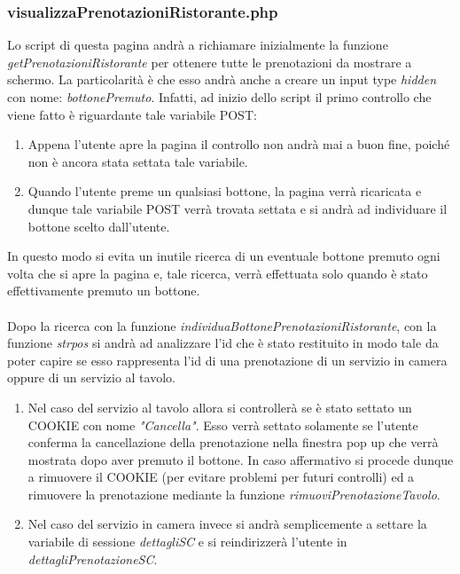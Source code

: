 \documentclass [a4paper, 12pt]{book}
\begin{document}
\subsubsection{visualizzaPrenotazioniRistorante.php}
Lo script di questa pagina andrà a richiamare inizialmente la funzione \textit{getPrenotazioniRistorante} per ottenere tutte le prenotazioni da mostrare a schermo. La particolarità è che esso andrà anche a creare un input type \textit{hidden} con nome: \textit{bottonePremuto}. Infatti, ad inizio dello script il primo controllo che viene fatto è riguardante tale variabile POST:
\begin{enumerate}
\item Appena l'utente apre la pagina il controllo non andrà mai a buon fine, poiché non è ancora stata settata tale variabile.
\item Quando l'utente preme un qualsiasi bottone, la pagina verrà ricaricata e dunque tale variabile POST verrà trovata settata e si andrà ad individuare il bottone scelto dall'utente.
\end{enumerate}
In questo modo si evita un inutile ricerca di un eventuale bottone premuto ogni volta che si apre la pagina e, tale ricerca, verrà effettuata solo quando è stato effettivamente premuto un bottone.\\\\
Dopo la ricerca con la funzione \textit{individuaBottonePrenotazioniRistorante}, con la funzione \textit{strpos} si andrà ad analizzare l'id che è stato restituito in modo tale da poter capire se esso rappresenta l'id di una prenotazione di un servizio in camera oppure di un servizio al tavolo.
\begin{enumerate}
\item Nel caso del servizio al tavolo allora si controllerà se è stato settato un COOKIE con nome \textit{"Cancella"}. Esso verrà settato solamente se l'utente conferma la cancellazione della prenotazione nella finestra pop up che verrà mostrata dopo aver premuto il bottone. In caso affermativo si procede dunque a rimuovere il COOKIE (per evitare problemi per futuri controlli) ed a rimuovere la prenotazione mediante la funzione \textit{rimuoviPrenotazioneTavolo}.
\item Nel caso del servizio in camera invece si andrà semplicemente a settare la variabile di sessione \textit{dettagliSC} e si reindirizzerà l'utente in \textit{dettagliPrenotazioneSC}.
\end{enumerate}
\end{document}
